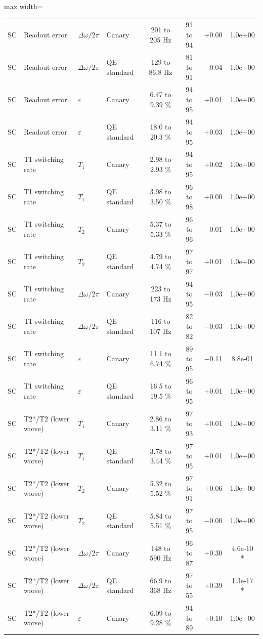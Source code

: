 \begin{table}[!t]
\begin{adjustbox}{max width=\linewidth}
\begin{tabular}{llllcccc}
SC & Readout error & $\Delta\omega/2\pi$ & Canary & 201 to 205 Hz & 91 to 94 & +0.00 & 1.0e+00 \\
SC & Readout error & $\Delta\omega/2\pi$ & QE standard & 129 to 86.8 Hz & 81 to 91 & $-$0.04 & 1.0e+00 \\
SC & Readout error & $\varepsilon$ & Canary & 6.47 to 9.39 \% & 94 to 95 & +0.01 & 1.0e+00 \\
SC & Readout error & $\varepsilon$ & QE standard & 18.0 to 20.3 \% & 94 to 95 & +0.03 & 1.0e+00 \\
SC & T1 switching rate & $T_1$ & Canary & 2.98 to 2.93 \% & 94 to 95 & +0.02 & 1.0e+00 \\
SC & T1 switching rate & $T_1$ & QE standard & 3.98 to 3.50 \% & 96 to 98 & +0.00 & 1.0e+00 \\
SC & T1 switching rate & $T_2$ & Canary & 5.37 to 5.33 \% & 96 to 96 & $-$0.01 & 1.0e+00 \\
SC & T1 switching rate & $T_2$ & QE standard & 4.79 to 4.74 \% & 97 to 97 & +0.01 & 1.0e+00 \\
SC & T1 switching rate & $\Delta\omega/2\pi$ & Canary & 223 to 173 Hz & 94 to 95 & $-$0.03 & 1.0e+00 \\
SC & T1 switching rate & $\Delta\omega/2\pi$ & QE standard & 116 to 107 Hz & 82 to 82 & $-$0.03 & 1.0e+00 \\
SC & T1 switching rate & $\varepsilon$ & Canary & 11.1 to 6.74 \% & 89 to 95 & $-$0.11 & 8.8e-01 \\
SC & T1 switching rate & $\varepsilon$ & QE standard & 16.5 to 19.5 \% & 96 to 95 & +0.01 & 1.0e+00 \\
SC & T2*/T2 (lower worse) & $T_1$ & Canary & 2.86 to 3.11 \% & 97 to 93 & +0.01 & 1.0e+00 \\
SC & T2*/T2 (lower worse) & $T_1$ & QE standard & 3.78 to 3.44 \% & 97 to 95 & +0.01 & 1.0e+00 \\
SC & T2*/T2 (lower worse) & $T_2$ & Canary & 5.32 to 5.52 \% & 97 to 91 & +0.06 & 1.0e+00 \\
SC & T2*/T2 (lower worse) & $T_2$ & QE standard & 5.84 to 5.51 \% & 97 to 95 & $-$0.00 & 1.0e+00 \\
SC & T2*/T2 (lower worse) & $\Delta\omega/2\pi$ & Canary & 148 to 590 Hz & 96 to 87 & +0.30 & 4.6e-10 * \\
SC & T2*/T2 (lower worse) & $\Delta\omega/2\pi$ & QE standard & 66.9 to 368 Hz & 97 to 55 & +0.39 & 1.3e-17 * \\
SC & T2*/T2 (lower worse) & $\varepsilon$ & Canary & 6.09 to 9.28 \% & 94 to 89 & +0.10 & 1.0e+00 \\

\end{tabular}
\end{adjustbox}
\end{table}
